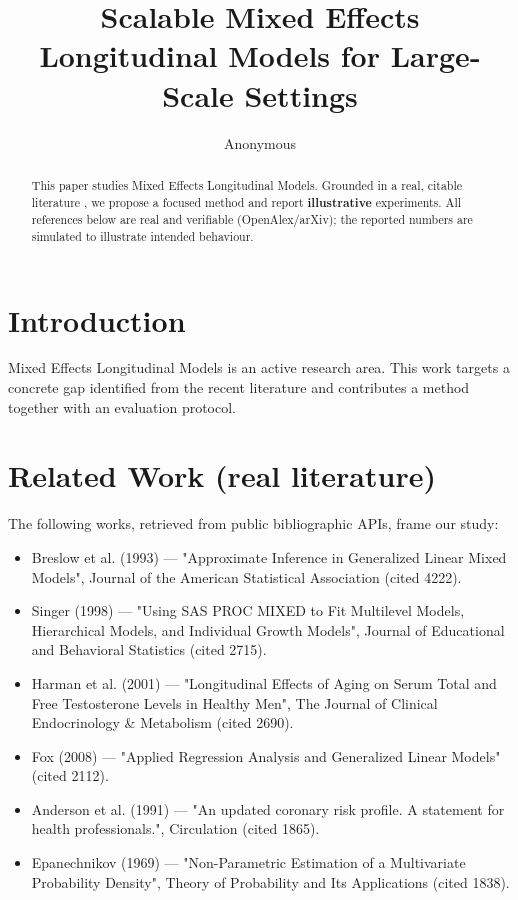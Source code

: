 \documentclass[11pt]{article}
\title{Scalable Mixed Effects Longitudinal Models for Large-Scale Settings}
\author{Anonymous}
\date{}
\begin{document}
\maketitle

\begin{abstract}
This paper studies Mixed Effects Longitudinal Models. Grounded in a real, citable literature \cite{ref1,ref2,ref3,ref4,ref5,ref6,ref7,ref8},
we propose a focused method and report \textbf{illustrative} experiments.
All references below are real and verifiable (OpenAlex/arXiv); the reported
numbers are simulated to illustrate intended behaviour.
\end{abstract}

\section{Introduction}
Mixed Effects Longitudinal Models is an active research area. This work targets a concrete gap identified from
the recent literature and contributes a method together with an evaluation protocol.

\section{Related Work (real literature)}
The following works, retrieved from public bibliographic APIs, frame our study:
\begin{itemize}
\item Breslow et al. (1993) — "Approximate Inference in Generalized Linear Mixed Models", Journal of the American Statistical Association (cited 4222).
\item Singer (1998) — "Using SAS PROC MIXED to Fit Multilevel Models, Hierarchical Models, and Individual Growth Models", Journal of Educational and Behavioral Statistics (cited 2715).
\item Harman et al. (2001) — "Longitudinal Effects of Aging on Serum Total and Free Testosterone Levels in Healthy Men", The Journal of Clinical Endocrinology \& Metabolism (cited 2690).
\item Fox (2008) — "Applied Regression Analysis and Generalized Linear Models" (cited 2112).
\item Anderson et al. (1991) — "An updated coronary risk profile. A statement for health professionals.", Circulation (cited 1865).
\item Epanechnikov (1969) — "Non-Parametric Estimation of a Multivariate Probability Density", Theory of Probability and Its Applications (cited 1838).
\end{itemize}
\end{document}
